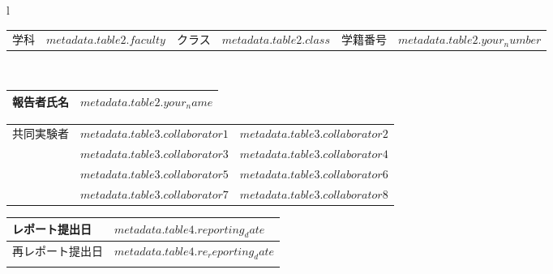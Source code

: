 \documentclass[$if(fontsize)$$fontsize$,$endif$$if(lang)$$babel-lang$,$endif$$if(papersize)$$papersize$,$endif$$for(classoption)$$classoption$$sep$,$endfor$]{$documentclass$}
\begin{document}
\begin{boldtabular}
  \begin{table}[!h]
    \hspace{1pt}
    \begin{tabular}{l}
      \begin{tabularx}{\textwidth}{|l|m{50mm}|l|m{12mm}|l|X|}\hline
        \parbox[c][10.5mm][c]{0pt}{} 学科  & $metadata.table2.faculty$ & クラス & $metadata.table2.class$ & 学籍番号 & $metadata.table2.your_number$ \\
      \end{tabularx}\\

      \begin{tabularx}{\textwidth}{|m{23mm}|X|}\hline
        \centering\fontsize{12pt}{18pt}\selectfont\textbf{報告者氏名}  & \parbox[c][16.5mm][c]{\textwidth}{{\fontsize{20pt}{30pt}\selectfont\textbf{$metadata.table2.your_name$}}} \\ \hline
      \end{tabularx}
    \end{tabular}
  \end{table}
\end{boldtabular}

\vspace{8mm}

\begin{narrowtabular}
\begin{tabularx}{\textwidth}{|m{22mm}|X|X|}\hline
  \multirow{4}{ 22mm }{共同実験者} & $metadata.table3.collaborator1$ & $metadata.table3.collaborator2$ \\ \cline{2-3}
 & $metadata.table3.collaborator3$ & $metadata.table3.collaborator4$ \\ \cline{2-3}
& $metadata.table3.collaborator5$ & $metadata.table3.collaborator6$ \\ \cline{2-3}
& $metadata.table3.collaborator7$ & $metadata.table3.collaborator8$ \\ \hline
\end{tabularx}
\end{narrowtabular}

\vspace{10mm}

\begin{datetabular}
\begin{tabularx}{\textwidth}{|l|X|}\hline
\parbox[c][8mm][c]{0pt}{}レポート提出日 & $metadata.table4.reporting_date$ \\ \hline
\parbox[c][8mm][c]{0pt}{}再レポート提出日 & $metadata.table4.re_reporting_date$ \\ \hline
\parbox[c][8mm][c]{0pt}{} &  \\ \hline
\end{tabularx}
\end{datetabular}
\end{document}
